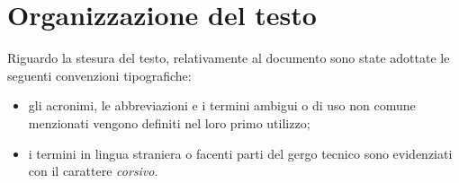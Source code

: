 \section{Organizzazione del testo}

Riguardo la stesura del testo, relativamente al documento sono state adottate le seguenti convenzioni tipografiche:
\begin{itemize}
	\item gli acronimi, le abbreviazioni e i termini ambigui o di uso non comune menzionati vengono definiti nel loro primo utilizzo;
	\item i termini in lingua straniera o facenti parti del gergo tecnico sono evidenziati con il carattere \emph{corsivo}.
\end{itemize}
